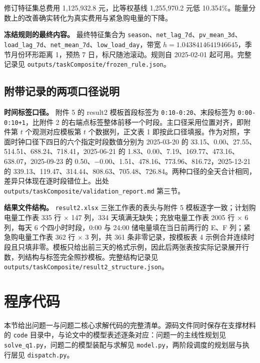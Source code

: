 \begin{appendices}
修订特征集总费用 1,125,932.8 元，比等权基线 1,255,970.2 元低 10.354\%。能量分数上的改善确实转化为真实费用与紧急购电量的下降。

\textbf{冻结规则的最终内容。} 最终特征集合为 \texttt{season}、\texttt{net\_lag\_7d}、\texttt{pv\_mean\_3d}、\texttt{load\_lag\_7d}、\texttt{net\_mean\_7d}、\texttt{low\_load\_day}，带宽 $h=1.0438414641946645$，季节月份环形距离 1，预热 7 日，标尺随池滚动。规则自 2025-02-01 起可用。完整记录见 \texttt{outputs/\allowbreak taskComposite/\allowbreak frozen\_rule.json}。

\subsection{附带记录的两项口径说明}

\textbf{时间标签口径。} 附件 5 的 result2 模板首段标签为 \texttt{0:10-0:20}、末段标签为 \texttt{0:00-0:10+1}，比附件 2 的右端点标签整体前移一个时段。主口径采用位置对齐，即附件第 $t$ 个观测对应模板第 $t$ 个数据列，正文表 1 即按此口径填报。作为对照，字面时钟口径下四日的六个指定时段数值分别为 2025-03-20 的 33.15、0.00、27.55、514.51、688.24、718.41，2025-06-21 的 1.83、0.00、7.19、169.77、473.16、638.07，2025-09-23 的 0.50、$-0.00$、1.51、478.16、773.96、816.72，2025-12-21 的 339.13、119.47、314.44、808.63、705.48、726.84。两种口径的全天合计相同，差异只体现在逐时段错位上。出处 \texttt{outputs/\allowbreak taskComposite/\allowbreak validation\_report.md} 第三节。

\textbf{结果文件结构。} \texttt{result2.xlsx} 三张工作表的表头与附件 5 模板逐字一致；计划购电量工作表 335 行 $\times$ 147 列，334 天填满无缺失；充放电量工作表 2005 行 $\times$ 6 列，每天 6 个四小时时段，0:00 与 24:00 储电量填在当日前两行的 E、F 列；紧急购电量工作表 362 行 $\times$ 3 列，共 361 条非零记录，按模板表 4 示例合并连续时段且只填非零。模板只给出前三天的格式示例，因此后两张表按实际记录展开行数，列结构与标签完全照抄模板。完整结构记录见 \texttt{outputs/\allowbreak taskComposite/\allowbreak result2\_structure.json}。

\section*{程序代码}

本节给出问题一与问题二核心求解代码的完整清单。源码文件同时保存在支撑材料的 \texttt{code} 目录中，与论文中的模型表述逐条对应：问题一的主线性规划见 \texttt{solve\_q1.py}，问题二的模型装配与求解见 \texttt{model.py}，两阶段调度的规划层与执行层见 \texttt{dispatch.py}。


\end{appendices}
